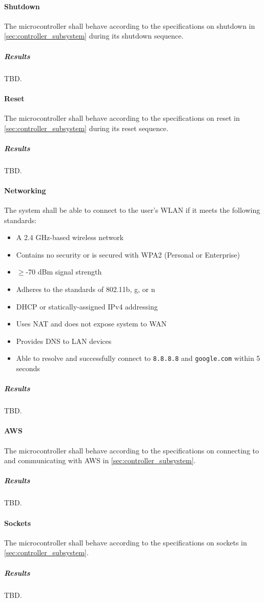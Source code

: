 \paragraph{Shutdown} The microcontroller shall behave according to the specifications on shutdown in \autoref{sec:controller_subsystem} during its shutdown sequence.
\subparagraph{Results} TBD.

\paragraph{Reset} The microcontroller shall behave according to the specifications on reset in \autoref{sec:controller_subsystem} during its reset sequence.
\subparagraph{Results} TBD.

\paragraph{Networking} The system shall be able to connect to the user's WLAN if it meets the following standards:
\begin{itemize}
    \item A 2.4 GHz-based wireless network
    \item Contains no security or is secured with WPA2 (Personal or Enterprise)
    \item $\geq$-70 dBm signal strength
    \item Adheres to the standards of 802.11b, g, or n
    \item DHCP or statically-assigned IPv4 addressing
    \item Uses NAT and does not expose system to WAN
    \item Provides DNS to LAN devices
    \item Able to resolve and successfully connect to \texttt{8.8.8.8} and \texttt{google.com} within 5 seconds
\end{itemize}
\subparagraph{Results} TBD.

\paragraph{AWS} The microcontroller shall behave according to the specifications on connecting to and communicating with AWS in \autoref{sec:controller_subsystem}.
\subparagraph{Results} TBD.

\paragraph{Sockets} The microcontroller shall behave according to the specifications on sockets in \autoref{sec:controller_subsystem}.
\subparagraph{Results} TBD.

